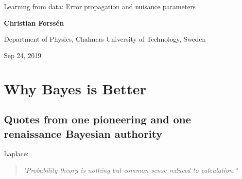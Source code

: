 \documentclass[%
oneside,                 %
final,                   %
10pt]{article}
\begin{document}

\newcommand{\exercisesection}[1]{\subsection*{#1}}







\thispagestyle{empty}

\begin{center}
{\LARGE\bf
\begin{spacing}{1.25}
Learning from data: Error propagation and nuisance parameters
\end{spacing}
}
\end{center}


\begin{center}
{\bf Christian Forssén}
\end{center}

    \begin{center}
\centerline{{\small Department of Physics, Chalmers University of Technology, Sweden}}
\end{center}
    

\begin{center}
Sep 24, 2019
\end{center}

\vspace{1cm}


\section{Why Bayes is Better}

\subsection{Quotes from one pioneering and one renaissance Bayesian authority}
Laplace:

\begin{quote}
\emph{"Probability theory is nothing but common sense reduced to calculation."}
\end{quote}
\end{document}
